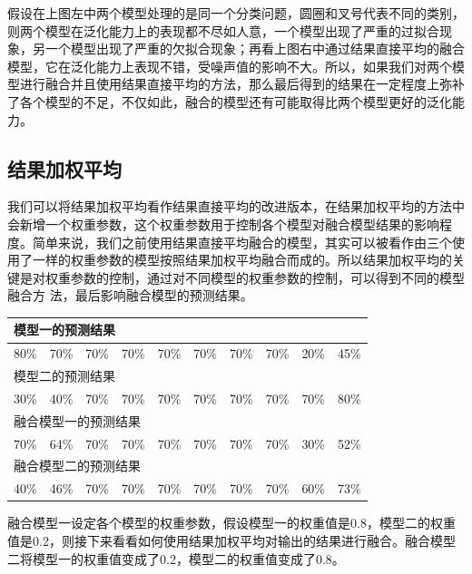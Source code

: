 \documentclass[openbib]{article}
\begin{document}
假设在上图左中两个模型处理的是同一个分类问题，圆圈和叉号代表不同的类别，则两个模型在泛化能力上的表现都不尽如人意，一个模型出现了严重的过拟合现象，另一个模型出现了严重的欠拟合现象；再看上图右中通过结果直接平均的融合模型，它在泛化能力上表现不错，受噪声值的影响不大。所以，如果我们对两个模型进行融合并且使用结果直接平均的方法，那么最后得到的结果在一定程度上弥补了各个模型的不足，不仅如此，融合的模型还有可能取得比两个模型更好的泛化能力。

\subsection{结果加权平均}

我们可以将结果加权平均看作结果直接平均的改进版本，在结果加权平均的方法中会新增一个权重参数，这个权重参数用于控制各个模型对融合模型结果的影响程度。简单来说，我们之前使用结果直接平均融合的模型，其实可以被看作由三个使用了一样的权重参数的模型按照结果加权平均融合而成的。所以结果加权平均的关键是对权重参数的控制，通过对不同模型的权重参数的控制，可以得到不同的模型融合方
法，最后影响融合模型的预测结果。

\begin{table}[htbp]
	\begin{tabular}{|l|l|l|l|l|l|l|l|l|l|}
		\hline
		\multicolumn{10}{|l|}{模型一的预测结果}                                     \\ \hline
		80\% & 70\% & 70\% & 70\% & 70\% & 70\% & 70\% & 70\% & 20\% & 45\% \\ \hline
		\multicolumn{10}{|l|}{模型二的预测结果}                                     \\ \hline
		30\% & 40\% & 70\% & 70\% & 70\% & 70\% & 70\% & 70\% & 70\% & 80\% \\ \hline
		\multicolumn{10}{|l|}{融合模型一的预测结果}                                   \\ \hline
		70\% & 64\% & 70\% & 70\% & 70\% & 70\% & 70\% & 70\% & 30\% & 52\% \\ \hline
		\multicolumn{10}{|l|}{融合模型二的预测结果}                                   \\ \hline
		40\% & 46\% & 70\% & 70\% & 70\% & 70\% & 70\% & 70\% & 60\% & 73\% \\ \hline
	\end{tabular}
\end{table}

融合模型一设定各个模型的权重参数，假设模型一的权重值是0.8，模型二的权重值是0.2，则接下来看看如何使用结果加权平均对输出的结果进行融合。融合模型二将模型一的权重值变成了0.2，模型二的权重值变成了0.8。
\end{document}
